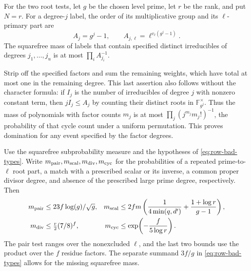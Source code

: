 For the two root tests, let \(g\) be the chosen level prime, let \(r\) be the rank, and put \(N=r\). For a degree-\(j\) label, the order of its multiplicative group and its \(\ell\)-primary part are
\[
  A_j=g^j-1,\qquad A_{j,\ell}=\ell^{v_\ell(g^j-1)}.
\]
 The
squarefree mass of labels that contain specified distinct
irreducibles of degrees $j_1,\ldots,j_u$ is at most
$\prod_i A_{j_i}^{-1}$.

Strip off the specified factors and sum
the remaining weights, which have total at most one in the
remaining degree. This last assertion also follows without the
character formula: if $I_j$ is the number of irreducibles of
degree $j$ with nonzero constant term, then $jI_j\le A_j$ by
counting their distinct roots in $\mathbb F_{g^j}^\times$.
Thus the mass of polynomials with factor counts $m_j$ is at
most $\prod_j(j^{m_j}m_j!)^{-1}$, the probability of that cycle
count under a uniform permutation. This proves domination for
any event specified by the factor degrees.

\begin{lemma}
\label{lem:finite-type-event-bounds}
Use the squarefree subprobability measure and the hypotheses of
\eqref{eq:row-bad-types}. Write \(m_{\rm pair},m_{\rm scal},m_{\rm div},m_{\rm cyc}\)
for the probabilities of a repeated prime-to-\(\ell\) root part, a match
with a prescribed scalar or its inverse, a common proper divisor degree,
and absence of the prescribed large prime degree, respectively. Then
\[
 \begin{aligned}
 m_{\rm pair}&\le 23f\log(g)/\sqrt g,&
 m_{\rm scal}&\le2fm\left(\frac1{4\min(q,d')}+\frac{1+\log r}{g-1}\right),\\
 m_{\rm div}&\le\tfrac r2(7/8)^f,&
 m_{\rm cyc}&\le\exp\!\left(-\frac f{5\log r}\right).
 \end{aligned}
\]
The pair test ranges over the nonexcluded \(\ell\), and the last two
bounds use the product over the \(f\) residue factors. The separate
summand \(3f/g\) in \eqref{eq:row-bad-types} allows for the missing
squarefree mass.
\end{lemma}


